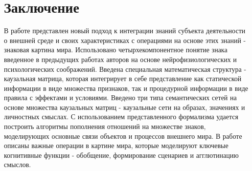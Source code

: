 \documentclass[12pt]{scrartcl}
\begin{document}
	\section*{Заключение}
	В работе представлен новый подход к интеграции знаний субъекта деятельности о внешней среде и своих характеристиках с операциями на основе этих знаний - знаковая картина мира. Использовано четырхекомпонентное понятие знака введенное в предыдущих работах авторов на основе нейрофизиологических и психологических соображений. Введена специальная математическая структура - каузальная матрица, которая интегрирует в себе представление как статической информации в виде множества признаков, так и процедурной информации в виде правила с эффектами и условиями. Введено три типа семантических сетей на основе множества каузальных матриц - каузальные сети на образах, значениях и личностных смыслах. С использованием представленного формализма удается построить алгоритмы пополнения отношений на множестве знаков, моделирующих основные связи объектов и процессов внешнего мира. В работе описаны важные операции в картине мира, которые моделируют ключевые когнитивные функции - обобщение, формирование сценариев и агглютинацию смыслов.
	
	\printbibliography
\end{document}
